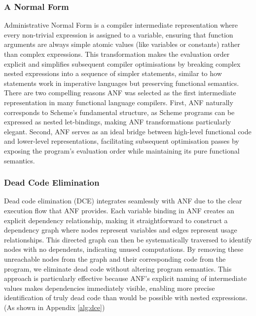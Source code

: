\documentclass[final]{cmpreport_02}
\begin{document}
\subsubsection{A Normal Form}
Administrative Normal Form \cite{flanagan1993essence} is a compiler intermediate representation where every non-trivial expression is assigned to a variable, ensuring that function arguments are always simple atomic values (like variables or constants) rather than complex expressions. This transformation makes the evaluation order explicit and simplifies subsequent compiler optimisations by breaking complex nested expressions into a sequence of simpler statements, similar to how statements work in imperative languages but preserving functional semantics.
There are two compelling reasons ANF was selected as the first intermediate representation in many functional language compilers. First, ANF naturally corresponds to Scheme's fundamental structure, as Scheme programs can be expressed as nested let-bindings, making ANF transformations particularly elegant. Second, ANF serves as an ideal bridge between high-level functional code and lower-level representations, facilitating subsequent optimisation passes by exposing the program's evaluation order while maintaining its pure functional semantics.

\subsubsection{Dead Code Elimination}
Dead code elimination (DCE) integrates seamlessly with ANF due to the clear execution flow that ANF provides. Each variable binding in ANF creates an explicit dependency relationship, making it straightforward to construct a dependency graph where nodes represent variables and edges represent usage relationships. This directed graph can then be systematically traversed to identify nodes with no dependents, indicating unused computations. By removing these unreachable nodes from the graph and their corresponding code from the program, we eliminate dead code without altering program semantics. This approach is particularly effective because ANF's explicit naming of intermediate values makes dependencies immediately visible, enabling more precise identification of truly dead code than would be possible with nested expressions. 
(As shown in Appendix \ref{alg:dce})
\end{document}
